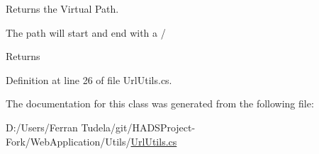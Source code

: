 Returns the Virtual Path. 

The path will start and end with a /

\begin{DoxyReturn}{Returns}

\end{DoxyReturn}


Definition at line 26 of file Url\+Utils.\+cs.



The documentation for this class was generated from the following file\+:\begin{DoxyCompactItemize}
\item 
D\+:/\+Users/\+Ferran Tudela/git/\+H\+A\+D\+S\+Project-\/\+Fork/\+Web\+Application/\+Utils/\mbox{\hyperlink{UrlUtils_8cs}{Url\+Utils.\+cs}}\end{DoxyCompactItemize}
